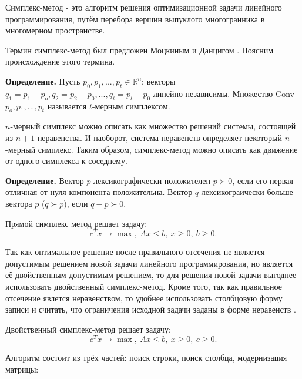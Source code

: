 \documentclass[a4paper,14pt,russian]{extreport}
\begin{document}
Симплекс-метод - это алгоритм решения оптимизационной задачи линейного программирования, путём перебора вершин выпуклого многогранника в многомерном пространстве.
\par Термин симплекс-метод был предложен Моцкиным и Данцигом \cite{dantzig}. Поясним происхождение этого термина. 
\par {\bf Определение.} Пусть $p_0,p_1,...,p_t \in \mathbb{R}^n$: векторы $q_1=p_1-p_o,q_2=p_2-p_0,...,q_t=p_t-p_0$ линейно независимы. Множество Conv{$p_o,p_1,...,p_t$} называется $t$-мерным симплексом. 
\par $n$-мерный симплекс можно описать как множество решений системы, состоящей из $n+1$ неравенства. И наоборот, система неравенств определяет некоторый $n$-мерный симплекс. Таким образом, симплекс-метод можно описать как движение от одного симплекса к соседнему. 
\par {\bf Определение.} Вектор $p$ лексикографически положителен $p \succ 0$, если его первая отличная от нуля компонента положительна. Вектор $q$ лексикограически больше вектора $p$ ($q \succ p$), если $q-p \succ 0$.
\par Прямой симплекс метод решает задачу:
  $$c^Tx \rightarrow \max,~ Ax \le b,~ x \ge 0,~ b \ge 0.$$
\par Так как оптимальное решение после правильного отсечения не является допустимым решением новой задачи линейного программирования, но является её двойственным допустимым решением, то для решения новой задачи выгоднее использовать двойственный симплекс-метод. Кроме того, так как правильное отсечение явлется неравенством, то удобнее использовать столбцовую форму записи и считать, что ограничения исходной задачи заданы в форме неравенств \cite{shevchenko}.
\par Двойственный симплекс-метод решает задачу:
  $$c^Tx \rightarrow \max,~ Ax \le b,~ x \ge 0,~ c \ge 0.$$
\par Алгоритм состоит из трёх частей: поиск строки, поиск столбца, модернизация матрицы:
\end{document}
